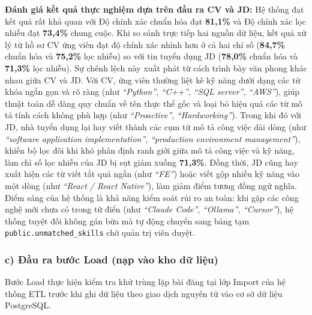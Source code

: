 \textbf{Đánh giá kết quả thực nghiệm dựa trên đầu ra CV và JD:} Hệ thống đạt kết quả rất khả quan với Độ chính xác chuẩn hóa đạt \textbf{81,1\%} và Độ chính xác lọc nhiễu đạt \textbf{73,4\%} chung cuộc. Khi so sánh trực tiếp hai nguồn dữ liệu, kết quả xử lý từ hồ sơ CV ứng viên đạt độ chính xác nhỉnh hơn ở cả hai chỉ số (\textbf{84,7\%} chuẩn hóa và \textbf{75,2\%} lọc nhiễu) so với tin tuyển dụng JD (\textbf{78,0\%} chuẩn hóa và \textbf{71,3\%} lọc nhiễu).
Sự chênh lệch này xuất phát từ cách trình bày văn phong khác nhau giữa CV và JD. Với CV, ứng viên thường liệt kê kỹ năng dưới dạng các từ khóa ngắn gọn và rõ ràng (như \textit{``Python''}, \textit{``C++''}, \textit{``SQL server''}, \textit{``AWS''}), giúp thuật toán dễ dàng quy chuẩn về tên thực thể gốc và loại bỏ hiệu quả các từ mô tả tính cách không phù hợp (như \textit{``Proactive''}, \textit{``Hardworking''}). Trong khi đó với JD, nhà tuyển dụng lại hay viết thành các cụm từ mô tả công việc dài dòng (như \textit{``software application implementation''}, \textit{``production environment management''}), khiến bộ lọc đôi khi khó phân định ranh giới giữa mô tả công việc và kỹ năng, làm chỉ số lọc nhiễu của JD bị sụt giảm xuống \textbf{71,3\%}. Đồng thời, JD cũng hay xuất hiện các từ viết tắt quá ngắn (như \textit{``FE''}) hoặc viết gộp nhiều kỹ năng vào một dòng (như \textit{``React / React Native''}), làm giảm điểm tương đồng ngữ nghĩa. Điểm sáng của hệ thống là khả năng kiểm soát rủi ro an toàn: khi gặp các công nghệ mới chưa có trong từ điển (như \textit{``Claude Code''}, \textit{``Ollama''}, \textit{``Cursor''}), hệ thống tuyệt đối không gán bừa mà tự động chuyển sang bảng tạm \texttt{public.unmatched\_skills} chờ quản trị viên duyệt.
\subsubsection*{c) Đầu ra bước Load (nạp vào kho dữ liệu)}
\label{subsubsec:etl_load}
Bước Load thực hiện kiểm tra khử trùng lặp bài đăng tại lớp Import của hệ thống ETL trước khi ghi dữ liệu theo giao dịch nguyên tử vào cơ sở dữ liệu PostgreSQL.


